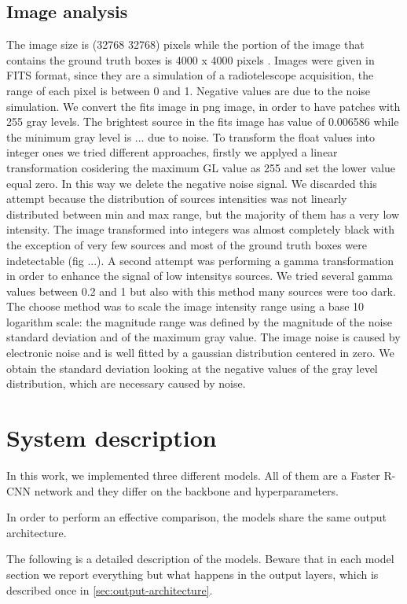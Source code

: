 \documentclass[a4paper,10pt]{report}
\begin{document}
\section{Image analysis}
The image size is (32768 32768) pixels while the portion of the image that contains the ground truth boxes is 4000 x 4000 pixels .
Images were given in FITS format, since they are a simulation of a radiotelescope acquisition, the range of each pixel is between 0 and 1. Negative values are due to the noise simulation. 
We convert the fits image in png image, in order to have patches with 255 gray levels. 
The brightest source in the fits image has value of 0.006586 while the minimum gray level is ... due to noise. To transform the float values into integer ones we tried different approaches, firstly we applyed a linear transformation cosidering the maximum GL value as 255 and set the lower value equal zero. In this way we delete the negative noise signal. We discarded this attempt because the distribution of sources intensities was not linearly distributed between min and max range, but the majority of them has a very low intensity. The image transformed into integers was almost completely black with the exception of very few sources and most of the ground truth boxes were indetectable (fig ...).
A second attempt was performing a gamma transformation in order to enhance the signal of low intensitys sources. We tried several gamma values between 0.2 and 1 but also with this method many sources were too dark.
The choose method was to scale the image intensity range using a base 10 logarithm scale: the magnitude range was defined by the magnitude of the noise standard deviation and of the maximum gray value. The image noise is caused by electronic noise and is well fitted by a gaussian distribution centered in zero.  We obtain the standard deviation  looking at the negative values of the gray level distribution, which are necessary caused by noise. 

\chapter{System description}\label{chap:system-description}

In this work, we implemented three different models. All of them are a Faster R-CNN network and they differ on the backbone and hyperparameters.

In order to perform an effective comparison, the models share the same output architecture.

The following is a detailed description of the models. Beware that in each model section we report everything but what happens in the output layers, which is described once in \ref{sec:output-architecture}.
\end{document}
